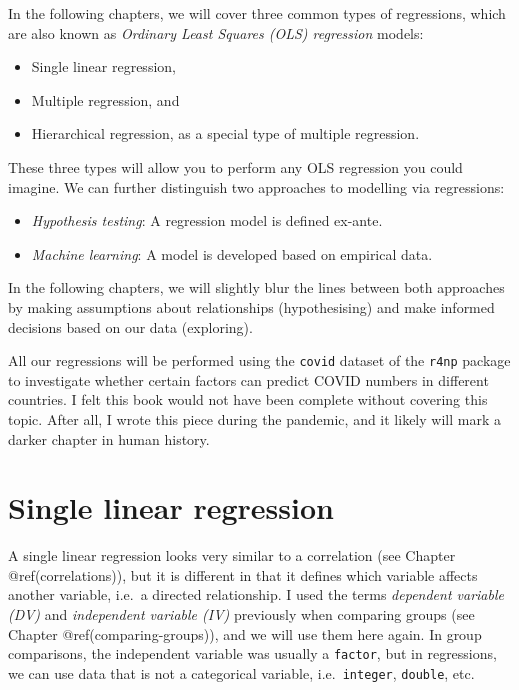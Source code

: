\documentclass[
  letterpaper,
]{krantz}
\begin{document}
In the following chapters, we will cover three common types of
regressions, which are also known as \emph{Ordinary Least Squares (OLS)
regression} models:

\begin{itemize}
\item
  Single linear regression,
\item
  Multiple regression, and
\item
  Hierarchical regression, as a special type of multiple regression.
\end{itemize}

These three types will allow you to perform any OLS regression you could
imagine. We can further distinguish two approaches to modelling via
regressions:

\begin{itemize}
\item
  \emph{Hypothesis testing}: A regression model is defined ex-ante.
\item
  \emph{Machine learning}: A model is developed based on empirical data.
\end{itemize}

In the following chapters, we will slightly blur the lines between both
approaches by making assumptions about relationships (hypothesising) and
make informed decisions based on our data (exploring).

All our regressions will be performed using the \texttt{covid} dataset
of the \texttt{r4np} package to investigate whether certain factors can
predict COVID numbers in different countries. I felt this book would not
have been complete without covering this topic. After all, I wrote this
piece during the pandemic, and it likely will mark a darker chapter in
human history.

\section{Single linear regression}\label{sec-single-linear-regression}

A single linear regression looks very similar to a correlation (see
Chapter @ref(correlations)), but it is different in that it defines
which variable affects another variable, i.e.~a directed relationship. I
used the terms \emph{dependent variable (DV)} and \emph{independent
variable (IV)} previously when comparing groups (see Chapter
@ref(comparing-groups)), and we will use them here again. In group
comparisons, the independent variable was usually a \texttt{factor}, but
in regressions, we can use data that is not a categorical variable,
i.e.~\texttt{integer}, \texttt{double}, etc.
\end{document}

